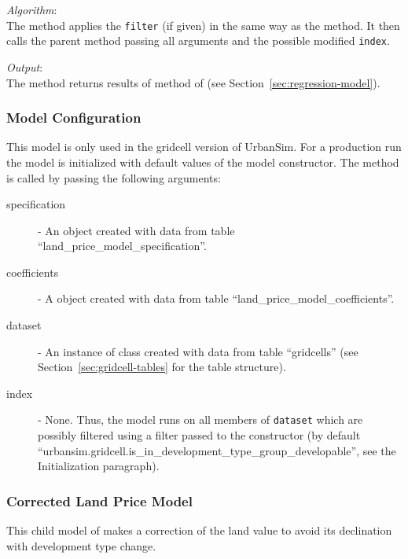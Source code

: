 {\it Algorithm}:\\[1mm]
The method applies the \verb|filter| (if given) in the same way as the
 method. It then calls the parent method 
passing all arguments and the possible modified \verb|index|.

{\it Output}:\\[1mm]
The method returns results of  method of
 \modelsindex (see Section~\ref{sec:regression-model}).

\subsubsection{Model Configuration}
\modelsindex
%
This model is only used in the gridcell version of UrbanSim.
For a production run the model \modelsindex is
initialized with default values of the model \modelsindex
constructor. The  method is called by passing the
following arguments:
\begin{description}
\item[specification] - An
 object created with data from table
``land_price_model_specification''.  \modelsindex
\item[coefficients] \coefficientsindex - A  \coefficientsindex object created
with data from table ``land_price_model_coefficients''. \coefficientsindex\modelsindex
\item[dataset] \datasetindex - An instance of class  created with data
  from table ``gridcells'' (see Section~\ref{sec:gridcell-tables} for the
  table structure).
\item[index] - None. Thus, the model \modelsindex runs on all members of \verb|dataset| \datasetindex which are possibly 
filtered using a filter passed to the constructor (by default ``urbansim.gridcell.is_in_development_type_group_developable'', see
the Initialization paragraph).
\end{description}

\subsubsection{Corrected Land Price Model}
\modelsindex
%
This child model \modelsindex of  makes a
correction of the land value to avoid its declination with development type
change.

